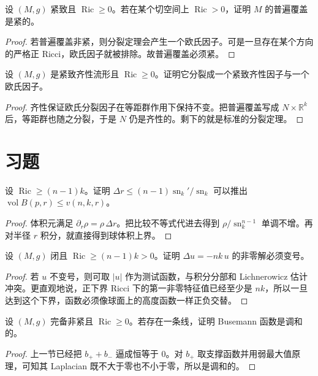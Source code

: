 \documentclass[11pt,a4paper,openany]{ctexbook}
\numberwithin{equation}{chapter}
\begin{document}
\begin{problem}
设 \((M,g)\) 紧致且 \(\operatorname{Ric}\ge 0\)。若在某个切空间上 \(\operatorname{Ric}>0\)，证明 \(M\) 的普遍覆盖是紧的。
\end{problem}
\begin{proof}
若普遍覆盖非紧，则分裂定理会产生一个欧氏因子。可是一旦存在某个方向的严格正 Ricci，欧氏因子就被排除。故普遍覆盖必须紧。
\end{proof}

\begin{problem}
设 \((M,g)\) 是紧致齐性流形且 \(\operatorname{Ric}\ge 0\)。证明它分裂成一个紧致齐性因子与一个欧氏因子。
\end{problem}
\begin{proof}
齐性保证欧氏分裂因子在等距群作用下保持不变。把普遍覆盖写成 \(N\times \mathbb R^k\) 后，等距群也随之分裂，于是 \(N\) 仍是齐性的。剩下的就是标准的分裂定理。
\end{proof}

\section{习题}

\begin{exercise}
设 \(\operatorname{Ric}\ge (n-1)k\)。证明 \(\Delta r\le (n-1)\operatorname{sn}_k'/\operatorname{sn}_k\) 可以推出 \(\operatorname{vol}B(p,r)\le v(n,k,r)\)。
\end{exercise}
\begin{proof}
体积元满足 \(\partial_r\rho=\rho\,\Delta r\)。把比较不等式代进去得到 \(\rho/\operatorname{sn}_k^{n-1}\) 单调不增。再对半径 \(r\) 积分，就直接得到球体积上界。
\end{proof}

\begin{exercise}
设 \((M,g)\) 闭且 \(\operatorname{Ric}\ge (n-1)k>0\)。证明 \(\Delta u=-nk\,u\) 的非零解必须变号。
\end{exercise}
\begin{proof}
若 \(u\) 不变号，则可取 \(|u|\) 作为测试函数，与积分分部和 Lichnerowicz 估计冲突。更直观地说，正下界 Ricci 下的第一非零特征值已经至少是 \(nk\)，所以一旦达到这个下界，函数必须像球面上的高度函数一样正负交替。
\end{proof}

\begin{exercise}
设 \((M,g)\) 完备非紧且 \(\operatorname{Ric}\ge 0\)。若存在一条线，证明 Busemann 函数是调和的。
\end{exercise}
\begin{proof}
上一节已经把 \(b_++b_-\) 逼成恒等于 \(0\)。对 \(b_+\) 取支撑函数并用弱最大值原理，可知其 Laplacian 既不大于零也不小于零，所以是调和的。
\end{proof}
\end{document}
